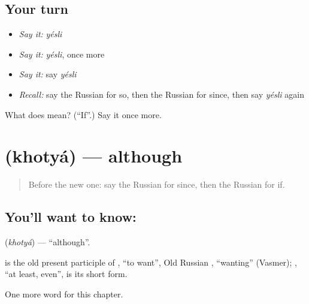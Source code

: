 \subsection*{Your turn}
\begin{itemize}
\raggedright
  \item \emph{Say it:} \emph{yésli}
  \item \emph{Say it:} \emph{yésli}, once more
  \item \emph{Say it:} say \emph{yésli}
  \item \emph{Recall:} say the Russian for so, then the Russian for since, then say \emph{yésli} again
\end{itemize}

\begin{tcolorbox}[breakable,colback=teal!4,colframe=teal!35!black,title={Before you move on}]
What does  mean? (\textquotedblleft{}If\textquotedblright{}.) Say it once more.
\end{tcolorbox}
\section[\texorpdfstring{\ru{хотя} (khotyá)}{хотя (khotyá)}]{ (khotyá) — although}

\label{lesson:RU-C154-khotya}



\begin{quote}
Before the new one: say the Russian for since, then the Russian for if.
\end{quote}

\subsection*{You'll want to know: }
\textbf{} (\emph{khotyá}) — \textquotedblleft{}although\textquotedblright{}.

\begin{cousinweb}
\textbf{} is the old present participle of \emph{}, \textquotedblleft{}to want\textquotedblright{}, Old Russian \emph{}, \textquotedblleft{}wanting\textquotedblright{} (Vasmer); \emph{}, \textquotedblleft{}at least, even\textquotedblright{}, is its short form.
\end{cousinweb}

\begin{grammarlens}[title={What you've built}]
One more word for this chapter.
\end{grammarlens}

